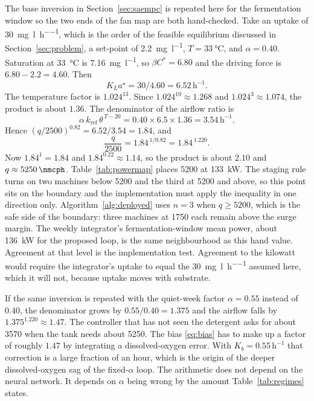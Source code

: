 The base inversion in Section~\ref{sec:saempc} is repeated here for the fermentation window so the two ends of the fan map are both hand-checked. Take an uptake of \SI{30}{\milli\gram\per\litre\per\hour}, which is the order of the feasible equilibrium discussed in Section~\ref{sec:problem}, a set-point of \SI{2.2}{\milli\gram\per\litre}, $T=\SI{33}{\celsius}$, and $\alpha=0.40$. Saturation at \SI{33}{\celsius} is \SI{7.16}{\milli\gram\per\litre}, so $\beta C^{*}=6.80$ and the driving force is $6.80-2.2=4.60$. Then
\begin{equation}
K_La^{\star}
=
30/4.60
=
6.52\,\mathrm{h^{-1}}.
\end{equation}
The temperature factor is $1.024^{13}$. Since $1.024^{10}\approx 1.268$ and $1.024^{3}\approx 1.074$, the product is about $1.36$. The denominator of the airflow ratio is
\begin{equation}
\alpha\,k_{\mathrm{ref}}\,\theta^{\,T-20}
=
0.40\times 6.5\times 1.36
=
3.54\,\mathrm{h^{-1}}.
\end{equation}
Hence $(q/2500)^{0.82}=6.52/3.54=1.84$, and
\begin{equation}
\frac{q}{2500}
=
1.84^{\,1/0.82}
=
1.84^{\,1.220}.
\end{equation}
Now $1.84^{1}=1.84$ and $1.84^{0.22}\approx 1.14$, so the product is about $2.10$ and $q\approx\SI{5250}{\nmcph}$. Table~\ref{tab:powermap} places \SI{5200}{\nmcph} at \SI{133}{\kilo\watt}. The staging rule turns on two machines below \SI{5200}{\nmcph} and the third at \SI{5200}{\nmcph} and above, so this point sits on the boundary and the implementation must apply the inequality in one direction only. Algorithm~\ref{alg:deployed} uses $n=3$ when $q\ge 5200$, which is the safe side of the boundary: three machines at \SI{1750}{\nmcph} each remain above the surge margin. The weekly integrator's fermentation-window mean power, about \SI{136}{\kilo\watt} for the proposed loop, is the same neighbourhood as this hand value. Agreement at that level is the implementation test. Agreement to the kilowatt would require the integrator's uptake to equal the \SI{30}{\milli\gram\per\litre\per\hour} assumed here, which it will not, because uptake moves with substrate.

If the same inversion is repeated with the quiet-week factor $\alpha=0.55$ instead of $0.40$, the denominator grows by $0.55/0.40=1.375$ and the airflow falls by $1.375^{1.220}\approx 1.47$. The controller that has not seen the detergent asks for about \SI{3570}{\nmcph} when the tank needs about \SI{5250}{\nmcph}. The bias \eqref{eq:bias} has to make up a factor of roughly $1.47$ by integrating a dissolved-oxygen error. With $K_{b}=0.55\,\mathrm{h^{-1}}$ that correction is a large fraction of an hour, which is the origin of the deeper dissolved-oxygen sag of the fixed-$\alpha$ loop. The arithmetic does not depend on the neural network. It depends on $\alpha$ being wrong by the amount Table~\ref{tab:regimes} states.

